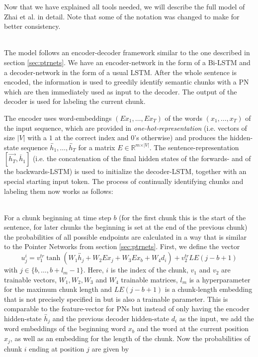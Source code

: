 \documentclass[twoside,11pt,a4paper]{article}
\theoremstyle{break}
\begin{document}
Now that we have explained all tools needed, we will describe the full model of Zhai et al. \cite{zhai:2017} in detail. Note that some of the notation was changed to make for better consistency.\\
\ \par
The model follows an encoder-decoder framework similar to the one described in section \ref{sec:ptrnets}. We have an encoder-network in the form of a Bi-LSTM and a decoder-network in the form of a usual LSTM. After the whole sentence is encoded, the information is used to greedily identify semantic chunks with a PN which are then immediately used as input to the decoder. The output of the decoder is used for labeling the current chunk.\par
The encoder uses word-embeddings $(E x_1, \dots, E x_T)$ of the words $(x_1, \dots, x_T)$ of the input sequence, which are provided in \textit{one-hot-representation} (i.e. vectors of size $\vert V \vert$ with a $1$ at the correct index and $0$'s otherwise) and produces the hidden-state sequence $\overleftrightarrow{h_1}, \dots, \overleftrightarrow{h_T}$ for a matrix $E \in \mathbb{R}^{m \times \vert V \vert}$. The sentence-representation $[\overrightarrow{h_T}, \overleftarrow{h_1}]$ (i.e. the concatenation of the final hidden states of the forwards- and of the backwards-LSTM) is used to initialize the decoder-LSTM, together with an special starting input token. The process of continually identifying chunks and labeling them now works as follows:\\
\ \par
For a chunk beginning at time step $b$ (for the first chunk this is the start of the sentence, for later chunks the beginning is set at the end of the previous chunk) the probabilities of all possible endpoints are calculated in a way that is similar to the Pointer Networks from section \ref{sec:ptrnets}. First, we define the vector
\[
	u_j^i = v_1^{tr} \tanh(W_1 \overleftrightarrow{h_j} + W_2 E x_j + W_3 E x_b + W_4 d_i) + v_2^{tr} LE(j-b+1)
\]
with $j \in \lbrace b, \dots, b+l_m-1 \rbrace$. Here, $i$ is the index of the chunk, $v_1$ and $v_2$ are trainable vectors, $W_1, W_2, W_3$ and $W_4$ trainable matrices, $l_m$ is a hyperparameter for the maximum chunk length and $LE(j-b+1)$ is a chunk-length embedding that is not precisely specified in \cite{zhai:2017} but is also a trainable parameter. This is comparable to the feature-vector for PNs but instead of only having the encoder hidden-state $\overleftrightarrow{h_j}$ and the previous decoder hidden-state $d_i$ as the input, we add the word embeddings of the beginning word $x_b$ and the word at the current position $x_j$, as well as an embedding for the length of the chunk. Now the probabilities of chunk $i$ ending at position $j$ are given by
\end{document}
